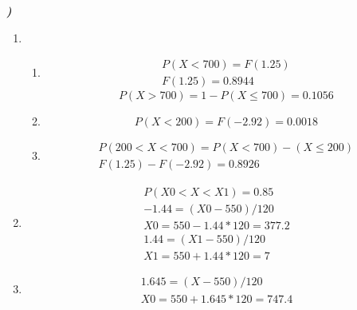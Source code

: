\documentclass[12pt]{article}
\newcounter{instn}
\newcommand{\instnum}{\arabic{instn}}
\newcommand{\myline}[1]{
    \emph{\textbf{#1)}}
    \addtocounter{instn}{1}
}
\newenvironment{question}
 {
    \myline{\instnum} 
    }
    {
 }
\begin{document}
    \begin{question}
        
        \begin{enumerate}[label={\textbf{\alph*)}}]
            \item 
            \hspace*{5pt}
            \begin{enumerate}[label={a\arabic{enumii})}]
                \item 
                \begin{align*}
                    P(X < 700) = F(1.25) \\ 
                    F(1.25) = 0.8944
                \end{align*}
                \begin{equation}
                    P(X > 700)  = 1 - P(X \leq 700) = 0.1056
                \end{equation}
                \item 
                \begin{equation}
                    P(X < 200) = F(-2.92) = 0.0018
                \end{equation}
                \item
                \begin{align*}
                    P(200 < X < 700) = P(X < 700) - (X \leq 200) \\
                    F(1.25) - F(-2.92) = 0.8926
                \end{align*}
            \end{enumerate}
            \item 
            \begin{align*}
                P(X0<X<X1) = 0.85 \\ 
                -1.44 = (X0 - 550) / 120 \\ 
                X0 = 550 - 1.44*120=377.2 \\ 
                1.44 = (X1 - 550) / 120 \\ 
                X1 = 550 + 1.44*120 = 7
            \end{align*}
            \item 
            \begin{align*}
                1.645 = (X-550)/120 \\ 
                X0 = 550 + 1.645*120=747.4
            \end{align*}
        \end{enumerate}

    \end{question}
\end{document}
